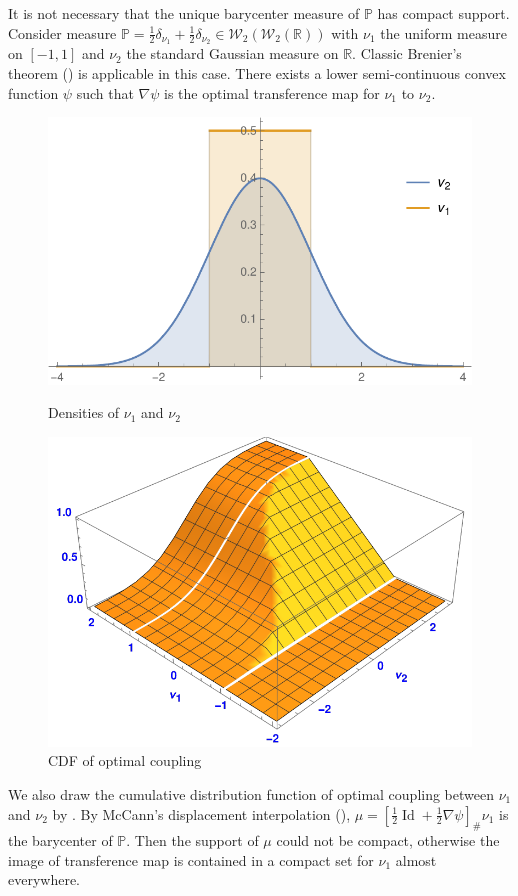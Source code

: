 \begin{rmk}
	It is not necessary that the unique barycenter measure of $\mathbb{P}$ has compact support.
	Consider measure $\mathbb{P}=
		\frac{1}{2}\delta_{\nu_1} + \frac{1}{2}\delta_{\nu_2}
		\in \mathcal{W}_2(\mathcal{W}_2(\mathbb{R}))$
	with $\nu_1$ the uniform measure on $[-1,1]$ and $\nu_2$ the standard Gaussian measure on $\mathbb{R}$.
	Classic Brenier's theorem (\cite[Theorem 2.12]{villani2003topics}) is applicable in this case.
	There exists a lower semi-continuous convex function $\psi$ such that
	$\nabla \psi$ is the optimal transference map for $\nu_1$ to $\nu_2$.
	\begin{figure}[h]
		\centering
		\begin{minipage}{.49\textwidth}
			\centering
			\includegraphics[height=.5\linewidth]{Chapters/OPT_line.pdf}
			\caption{Densities of $\nu_1$ and $\nu_2$}
		\end{minipage}
		\begin{minipage}{.49\textwidth}
			\centering
			\includegraphics[height=.5\linewidth]{Chapters/cdf_line.pdf}
			\caption{CDF of optimal coupling}
		\end{minipage}
	\end{figure}
	We also draw the cumulative distribution function
	of optimal coupling between $\nu_1$ and $\nu_2$
	by \cite[Theorem 2.18]{villani2003topics}.
	By McCann's displacement interpolation (\cite[Section 5.1.3]{villani2003topics}),
	$\mu =[\frac{1}{2} \operatorname{Id} + \frac{1}{2} \nabla \psi]_{\#} \nu_1$ is the barycenter of $\mathbb{P}$.
	Then the support of $\mu$ could not be compact,
	otherwise the image of transference map is contained
	in a compact set for $\nu_1$ almost everywhere.
\end{rmk}
